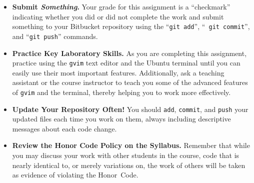           \begin{itemize}

            \item {\bf Submit \textbf{\textit{Something}}.} Your grade for this assignment is a ``checkmark'' indicating whether you
              did or did not complete the work and submit something to your Bitbucket repository using the ``{\tt git add}'', ``{\tt
              git commit}'', and ``{\tt git push}'' commands.

            \item {\bf Practice Key Laboratory Skills.} As you are completing this assignment, practice using the {\tt gvim} text
              editor and the Ubuntu terminal until you can easily use their most important features.  Additionally, ask
              a teaching assistant or the course instructor to teach you some of the advanced features of {\tt gvim} and the
              terminal, thereby helping you to work more effectively.

            \item {\bf Update Your Repository Often!} You should {\tt add}, {\tt commit}, and {\tt push} your updated files each
              time you work on them, always including descriptive messages about each code change.

            \item {\bf Review the Honor Code Policy on the Syllabus.} Remember that while you may discuss your work with other
              students in the course, code that is nearly identical to, or merely variations on, the work of others will be
              taken as evidence of violating the \mbox{Honor Code}.

          \end{itemize}
          

